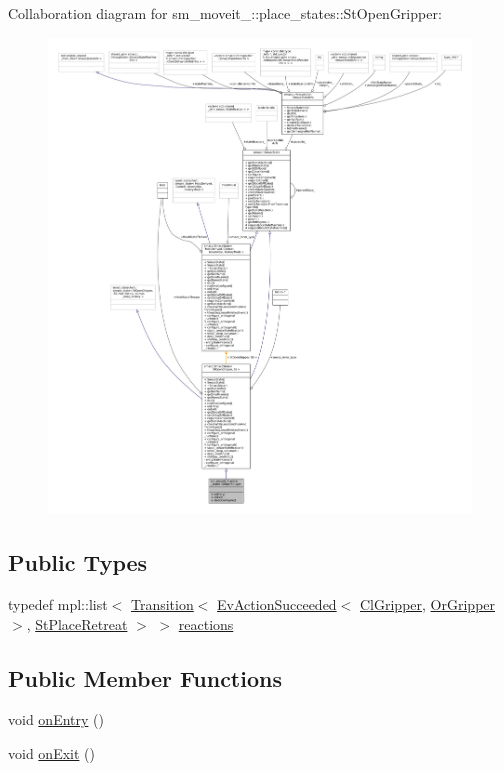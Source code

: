 Collaboration diagram for sm\+\_\+moveit\+\_\+:\+:place\+\_\+states\+:\+:St\+Open\+Gripper\+:
\nopagebreak
\begin{figure}[H]
\begin{center}
\leavevmode
\includegraphics[width=350pt]{structsm__moveit__4_1_1place__states_1_1StOpenGripper__coll__graph}
\end{center}
\end{figure}
\subsection*{Public Types}
\begin{DoxyCompactItemize}
\item 
typedef mpl\+::list$<$ \hyperlink{classsmacc_1_1Transition}{Transition}$<$ \hyperlink{structsmacc_1_1default__events_1_1EvActionSucceeded}{Ev\+Action\+Succeeded}$<$ \hyperlink{classsm__moveit__4_1_1cl__gripper_1_1ClGripper}{Cl\+Gripper}, \hyperlink{classsm__moveit__4_1_1OrGripper}{Or\+Gripper} $>$, \hyperlink{structsm__moveit__4_1_1place__states_1_1StPlaceRetreat}{St\+Place\+Retreat} $>$ $>$ \hyperlink{structsm__moveit__4_1_1place__states_1_1StOpenGripper_a66d2d0a95ac3b2d672ac8d3735fd2a3c}{reactions}
\end{DoxyCompactItemize}
\subsection*{Public Member Functions}
\begin{DoxyCompactItemize}
\item 
void \hyperlink{structsm__moveit__4_1_1place__states_1_1StOpenGripper_a9f9a27783751dcb8f993064447c29602}{on\+Entry} ()
\item 
void \hyperlink{structsm__moveit__4_1_1place__states_1_1StOpenGripper_abb7f1ffb0505097dd7d1495c0cc8081a}{on\+Exit} ()
\end{DoxyCompactItemize}

